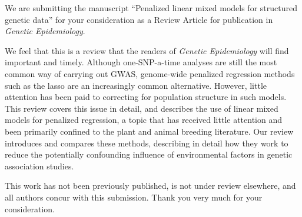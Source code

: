\documentclass{uiletter}
\begin{document}

We are submitting the manuscript ``Penalized linear mixed models for structured genetic data'' for your consideration as a Review Article for publication in {\em Genetic Epidemiology}.

We feel that this is a review that the readers of {\em Genetic Epidemiology} will find important and timely.  Although one-SNP-a-time analyses are still the most common way of carrying out GWAS, genome-wide penalized regression methods such as the lasso are an increasingly common alternative.  However, little attention has been paid to correcting for population structure in such models.  This review covers this issue in detail, and describes the use of linear mixed models for penalized regression, a topic that has received little attention and been primarily confined to the plant and animal breeding literature.  Our review introduces and compares these methods, describing in detail how they work to reduce the potentially confounding influence of environmental factors in genetic association studies.

This work has not been previously published, is not under review elsewhere, and all authors concur with this submission.  Thank you very much for your consideration.

\EndLetter
\end{document}
